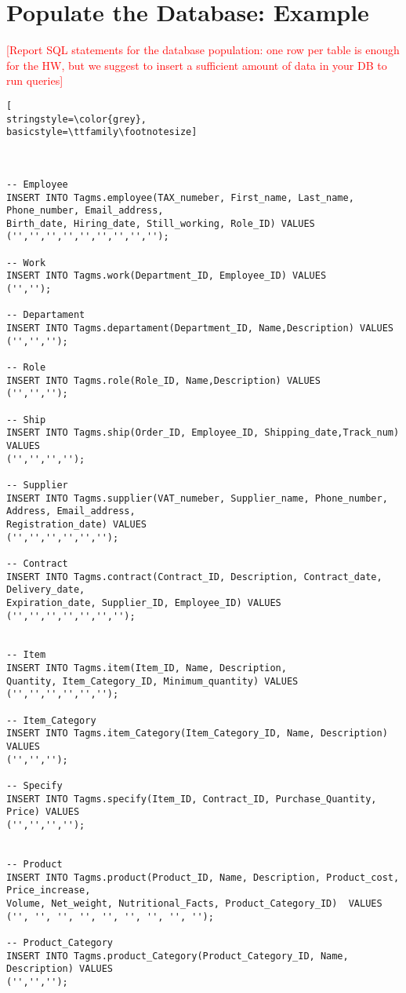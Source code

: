 
\section{Populate the Database: Example}
\textcolor{red}{[Report SQL statements for the database population: one row per table is enough for the HW, but we suggest to insert a sufficient amount of data in your DB to run queries]}


\begin{lstlisting}[
stringstyle=\color{grey},
basicstyle=\ttfamily\footnotesize]



-- Employee
INSERT INTO Tagms.employee(TAX_numeber, First_name, Last_name, Phone_number, Email_address,
Birth_date, Hiring_date, Still_working, Role_ID) VALUES
('','','','','','','','','');

-- Work
INSERT INTO Tagms.work(Department_ID, Employee_ID) VALUES 
('','');

-- Departament
INSERT INTO Tagms.departament(Department_ID, Name,Description) VALUES ('','','');

-- Role
INSERT INTO Tagms.role(Role_ID, Name,Description) VALUES 
('','','');

-- Ship
INSERT INTO Tagms.ship(Order_ID, Employee_ID, Shipping_date,Track_num) VALUES 
('','','','');

-- Supplier
INSERT INTO Tagms.supplier(VAT_numeber, Supplier_name, Phone_number, Address, Email_address,
Registration_date) VALUES
('','','','','','');

-- Contract
INSERT INTO Tagms.contract(Contract_ID, Description, Contract_date, Delivery_date,
Expiration_date, Supplier_ID, Employee_ID) VALUES 
('','','','','','','');


-- Item
INSERT INTO Tagms.item(Item_ID, Name, Description,
Quantity, Item_Category_ID, Minimum_quantity) VALUES 
('','','','','','');

-- Item_Category
INSERT INTO Tagms.item_Category(Item_Category_ID, Name, Description) VALUES
('','','');

-- Specify
INSERT INTO Tagms.specify(Item_ID, Contract_ID, Purchase_Quantity, Price) VALUES
('','','','');


-- Product
INSERT INTO Tagms.product(Product_ID, Name, Description, Product_cost, Price_increase,
Volume, Net_weight, Nutritional_Facts, Product_Category_ID)  VALUES 
('', '', '', '', '', '', '', '', '');

-- Product_Category
INSERT INTO Tagms.product_Category(Product_Category_ID, Name, Description) VALUES 
('','','');


\end{lstlisting}
